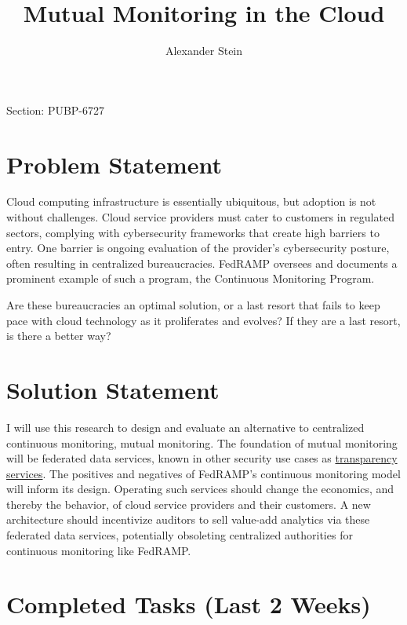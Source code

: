 \documentclass{jdf}
\begin{document}
Section: PUBP-6727
\title{Mutual Monitoring in the Cloud}
\author{Alexander Stein}

\maketitle
\thispagestyle{fancy}


\section*{Problem Statement}

Cloud computing infrastructure is essentially ubiquitous, but adoption is not without challenges. Cloud service providers must cater to customers in regulated sectors, complying with cybersecurity frameworks that create high barriers to entry. One barrier is ongoing evaluation of the provider's cybersecurity posture, often resulting in centralized bureaucracies. FedRAMP oversees and documents a prominent example of such a program, the Continuous Monitoring Program.

Are these bureaucracies an optimal solution, or a last resort that fails to keep pace with cloud technology as it proliferates and evolves? If they are a last resort, is there a better way?

\section*{Solution Statement}

I will use this research to design and evaluate an alternative to centralized continuous monitoring, mutual monitoring. The foundation of mutual monitoring will be federated data services, known in other security use cases as \hyperlink{https://transparency.dev}{transparency services}. The positives and negatives of FedRAMP's continuous monitoring model will inform its design. Operating such services should change the economics, and thereby the behavior, of cloud service providers and their customers. A new architecture should incentivize auditors to sell value-add analytics via these federated data services, potentially obsoleting centralized authorities for continuous monitoring like FedRAMP.

\section*{Completed Tasks (Last 2 Weeks)}
\end{document}
